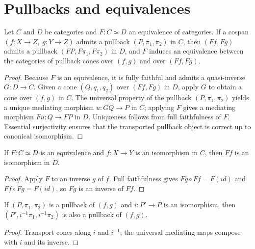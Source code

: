 
\section{Pullbacks and equivalences}

\begin{theorem}
Let $C$ and $D$ be categories and $F : C \simeq D$ an equivalence of categories. If a cospan $(f : X \to Z,\; g : Y \to Z)$ admits a pullback $(P, \pi_1, \pi_2)$ in $C$, then $(F f, F g)$ admits a pullback $(F P, F \pi_1, F \pi_2)$ in $D$, and $F$ induces an equivalence between the categories of pullback cones over $(f, g)$ and over $(F f, F g)$.
\end{theorem}
\begin{proof}
Because $F$ is an equivalence, it is fully faithful and admits a quasi-inverse $G : D \to C$. Given a cone $(Q, q_1, q_2)$ over $(F f, F g)$ in $D$, apply $G$ to obtain a cone over $(f, g)$ in $C$. The universal property of the pullback $(P, \pi_1, \pi_2)$ yields a unique mediating morphism $u : GQ \to P$ in $C$; applying $F$ gives a mediating morphism $F u : Q \to F P$ in $D$. Uniqueness follows from full faithfulness of $F$. Essential surjectivity ensures that the transported pullback object is correct up to canonical isomorphism.
\end{proof}

\begin{lemma}
If $F : C \simeq D$ is an equivalence and $f : X \to Y$ is an isomorphism in $C$, then $F f$ is an isomorphism in $D$.
\end{lemma}
\begin{proof}
Apply $F$ to an inverse $g$ of $f$. Full faithfulness gives $F g \circ F f = F(id)$ and $F f \circ F g = F(id)$, so $F g$ is an inverse of $F f$.
\end{proof}

\begin{proposition}
If $(P, \pi_1, \pi_2)$ is a pullback of $(f, g)$ and $i : P' \to P$ is an isomorphism, then $(P', i^{-1}\pi_1, i^{-1}\pi_2)$ is also a pullback of $(f, g)$.
\end{proposition}
\begin{proof}
Transport cones along $i$ and $i^{-1}$; the universal mediating maps compose with $i$ and its inverse.
\end{proof}

